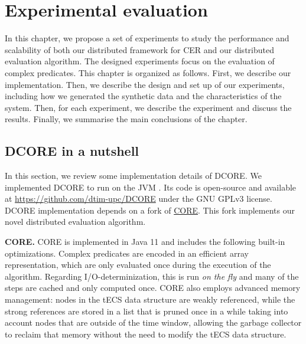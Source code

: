 \chapter{Experimental evaluation}\label{chapter:experimental_evaluation}

In this chapter, we propose a set of experiments to study the performance and scalability of both our distributed framework for CER and our distributed evaluation algorithm. The designed experiments focus on the evaluation of complex predicates. This chapter is organized as follows. First, we describe our implementation. Then, we describe the design and set up of our experiments, including how we generated the synthetic data and the characteristics of the system. Then, for each experiment, we describe the experiment and discuss the results. Finally, we summarise the main conclusions of the chapter.

\section{DCORE in a nutshell}\label{chapter:dcore}

In this section, we review some implementation details of DCORE. We implemented DCORE to run on the JVM \cite{jvm}. Its code is open-source and available at \url{https://github.com/dtim-upc/DCORE} under the GNU GPLv3 license. DCORE implementation depends on a fork of \href{https://github.com/dtim-upc/CORE2/tree/distributed_enumeration}{CORE}. This fork implements our novel distributed evaluation algorithm.

\textbf{CORE.} CORE is implemented in Java 11 and includes the following built-in optimizations. Complex predicates are encoded in an efficient array representation, which are only evaluated once during the execution of the algorithm. Regarding I/O-determinization, this is run \emph{on the fly} and many of the steps are cached and only computed once. CORE also employs advanced memory management: nodes in the tECS data structure are weakly referenced, while the strong references are stored in a list that is pruned once in a while taking into account nodes that are outside of the time window, allowing the garbage collector to reclaim that memory without the need to modify the tECS data structure.

